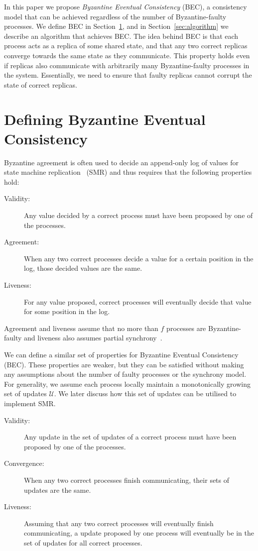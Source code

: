 \documentclass[manuscript,anonymous]{acmart}
\begin{document}
In this paper we propose \emph{Byzantine Eventual Consistency} (BEC), a consistency model that can be achieved regardless of the number of Byzantine-faulty processes.
We define BEC in Section~\ref{sec:properties}, and in Section~\ref{sec:algorithm} we describe an algorithm that achieves BEC.
The idea behind BEC is that each process acts as a replica of some shared state, and that any two correct replicas converge towards the same state as they communicate.
This property holds even if replicas also communicate with arbitrarily many Byzantine-faulty processes in the system.
Essentially, we need to ensure that faulty replicas cannot corrupt the state of correct replicas.

\section{Defining Byzantine Eventual Consistency}\label{sec:properties}

Byzantine agreement is often used to decide an append-only log of values for state machine replication~\cite{Schneider:1990} (SMR) and thus requires that the following properties hold:

\begin{description}
\item[Validity:] Any value decided by a correct process must have been proposed by one of the processes.
\item[Agreement:] When any two correct processes decide a value for a certain position in the log, those decided values are the same.
\item[Liveness:] For any value proposed, correct processes will eventually decide that value for some position in the log.
\end{description}

Agreement and liveness assume that no more than $f$ processes are Byzantine-faulty and liveness also assumes partial synchrony~\cite{Dwork:1988}.

We can define a similar set of properties for Byzantine Eventual Consistency (BEC).
These properties are weaker, but they can be satisfied without making any assumptions about the number of faulty processes or the synchrony model.
For generality, we assume each process locally maintain a monotonically growing set of updates $\mathcal{U}$.
We later discuss how this set of updates can be utilised to implement SMR.

\begin{description}
\item[Validity:] Any update in the set of updates of a correct process must have been proposed by one of the processes.
\item[Convergence:] When any two correct processes finish communicating, their sets of updates are the same.
\item[Liveness:] Assuming that any two correct processes will eventually finish communicating, a update proposed by one process will eventually be in the set of updates for all correct processes.
\end{description}
\end{document}
